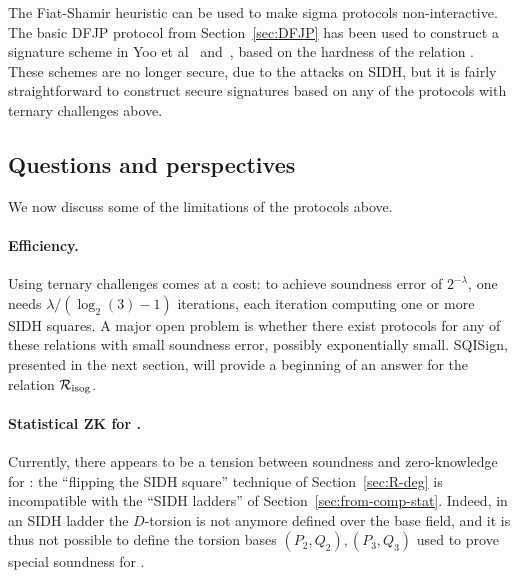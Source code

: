 The Fiat-Shamir heuristic can be used to make sigma protocols non-interactive.
The basic DFJP protocol from Section~\ref{sec:DFJP} has been used to construct a signature scheme in Yoo et al~\cite{YAJJS17} and~\cite{GPS20}, based on the hardness of the relation \R[isog]. 
These schemes are no longer secure, due to the attacks on SIDH, but it is fairly straightforward to construct secure signatures based on any of the protocols with ternary challenges above.



%
%


\subsection{Questions and perspectives}

We now discuss some of the limitations of the protocols above.

\paragraph{Efficiency.}
Using ternary challenges comes at a cost: to achieve soundness error of $2^{-\lambda}$, one needs $\lambda/(\log_2(3)-1)$ iterations, each iteration computing one or more SIDH squares.
A major open problem is whether there exist protocols for any of these relations with small soundness error, possibly exponentially small.
SQISign, presented in the next section, will provide a beginning of an answer for the relation $\R[isog]$.

\paragraph{Statistical ZK for \R[deg].}
Currently, there appears to be a tension between soundness and
zero-knowledge for \R[deg]: the ``flipping the SIDH square'' technique
of Section~\ref{sec:R-deg} is incompatible with the ``SIDH ladders''
of Section~\ref{sec:from-comp-stat}.  Indeed, in an SIDH ladder the
$D$-torsion is not anymore defined over the base field, and it is thus
not possible to define the torsion bases $(P_2,Q_2),(P_3,Q_3)$ used to
prove special soundness for \R[deg].


